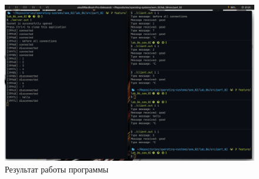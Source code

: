 \begin{figure}[H]
    \centering
    \includegraphics[scale=0.4]{img/inet_socket.png}
    \caption{Результат работы программы}
\end{figure}
